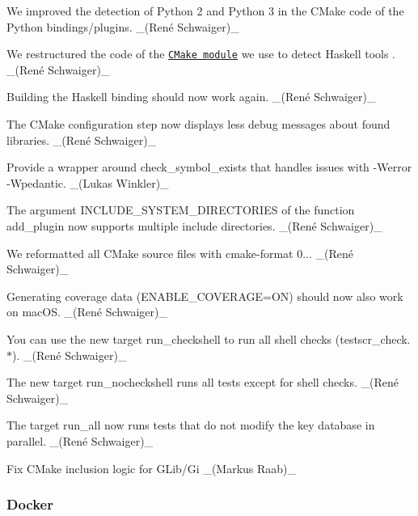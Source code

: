 \begin{DoxyItemize}
\item We improved the detection of Python 2 and Python 3 in the C\+Make code of the Python bindings/plugins. \+\_\+(René Schwaiger)\+\_\+
\item We restructured the code of the \href{https://master.libelektra.org/cmake/Modules/FindHaskell.cmake}{\tt C\+Make module} we use to detect Haskell tools . \+\_\+(René Schwaiger)\+\_\+
\item Building the Haskell binding should now work again. \+\_\+(René Schwaiger)\+\_\+
\item The C\+Make configuration step now displays less debug messages about found libraries. \+\_\+(René Schwaiger)\+\_\+
\item Provide a wrapper around {\ttfamily check\+\_\+symbol\+\_\+exists} that handles issues with {\ttfamily -\/\+Werror -\/\+Wpedantic}. \+\_\+(\+Lukas Winkler)\+\_\+
\item The argument {\ttfamily I\+N\+C\+L\+U\+D\+E\+\_\+\+S\+Y\+S\+T\+E\+M\+\_\+\+D\+I\+R\+E\+C\+T\+O\+R\+I\+ES} of the function {\ttfamily add\+\_\+plugin} now supports multiple include directories. \+\_\+(René Schwaiger)\+\_\+
\item We reformatted all C\+Make source files with cmake-\/format 0... \+\_\+(René Schwaiger)\+\_\+
\item Generating coverage data ({\ttfamily E\+N\+A\+B\+L\+E\+\_\+\+C\+O\+V\+E\+R\+A\+GE=ON}) should now also work on mac\+OS. \+\_\+(René Schwaiger)\+\_\+
\item You can use the new target {\ttfamily run\+\_\+checkshell} to run all shell checks ({\ttfamily testscr\+\_\+check.$\ast$}). \+\_\+(René Schwaiger)\+\_\+
\item The new target {\ttfamily run\+\_\+nocheckshell} runs all tests except for shell checks. \+\_\+(René Schwaiger)\+\_\+
\item The target {\ttfamily run\+\_\+all} now runs tests that do not modify the key database in parallel. \+\_\+(René Schwaiger)\+\_\+
\item Fix C\+Make inclusion logic for G\+Lib/\+Gi \+\_\+(\+Markus Raab)\+\_\+
\end{DoxyItemize}

\subsubsection*{Docker}


